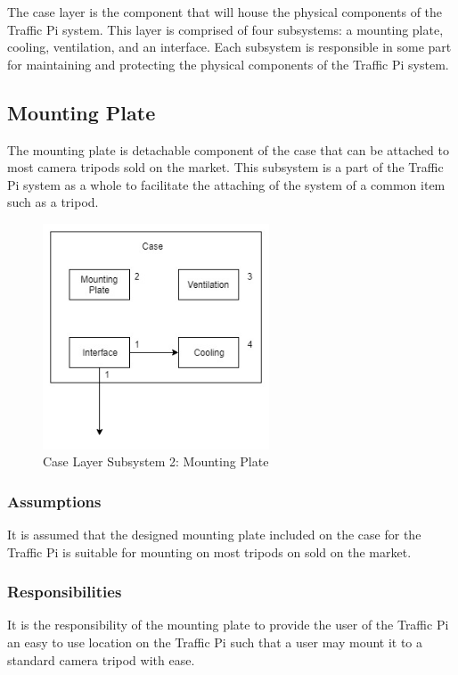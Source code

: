 The case layer is the component that will house the physical components of the Traffic Pi system. This layer is comprised of four subsystems: a mounting plate, cooling, ventilation, and an interface. Each subsystem is responsible in some part for maintaining and protecting the physical components of the Traffic Pi system.

\subsection{Mounting Plate}
The mounting plate is detachable component of the case that can be attached to most camera tripods sold on the market. This subsystem is a part of the Traffic Pi system as a whole to facilitate the attaching of the system of a common item such as a tripod.

\begin{figure}[h!]
	\centering
 	\includegraphics[width=0.60\textwidth]{images/case_layer}
 \caption{Case Layer Subsystem 2: Mounting Plate}
\end{figure}

\subsubsection{Assumptions}
It is assumed that the designed mounting plate included on the case for the Traffic Pi is suitable for mounting on most tripods on sold on the market.

\subsubsection{Responsibilities}
It is the responsibility of the mounting plate to provide the user of the Traffic Pi an easy to use location on the Traffic Pi such that a user may mount it to a standard camera tripod with ease.

